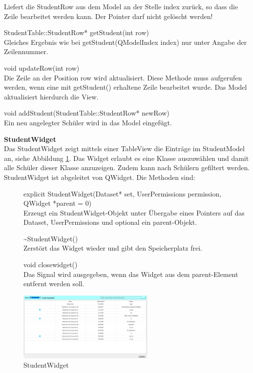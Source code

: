 \begin{description}
	Liefert die StudentRow aus dem Model an der Stelle index zurück, so dass die Zeile bearbeitet werden kann. Der Pointer darf nicht gelöscht werden!
  \item[ ] StudentTable::StudentRow* getStudent(int row)\\
	Gleiches Ergebnis wie bei getStudent(QModelIndex index) nur unter Angabe der Zeilennummer.
  \item[ ] void updateRow(int row)\\
	Die Zeile an der Position row wird aktualisiert. Diese Methode muss aufgerufen werden, wenn eine mit getStudent() erhaltene Zeile bearbeitet wurde. Das Model aktualisiert hierdurch die View.
  \item[ ] void addStudent(StudentTable::StudentRow* newRow)\\
	Ein neu angelegter Schüler wird in das Model eingefügt.
\end{description}
    
\textbf{StudentWidget}\\
Das StudentWidget zeigt mittels einer TableView die Einträge im StudentModel an, siehe Abbildung \ref{fig:StudentWidget}. Das Widget erlaubt es eine Klasse auszuwählen und damit alle Schüler dieser Klasse anzuzeigen. Zudem kann nach Schülern gefiltert werden. StudentWidget ist abgeleitet von QWidget. Die Methoden sind:
\begin{description}
	\item[ ] explicit StudentWidget(Dataset* set, UserPermissions permission, QWidget *parent = 0)\\
	Erzeugt ein StudentWidget-Objekt unter Übergabe eines Pointers auf das Dataset, UserPermissions und optional ein parent-Objekt.
  \item[ ] \~{}StudentWidget()\\
	Zerstört das Widget wieder und gibt den Speicherplatz frei.
	\item[ ] void closewidget()\\
	Das Signal wird ausgegeben, wenn das Widget aus dem parent-Element entfernt werden soll.	
\end{description}
\begin{figure}[htb]
	\centering
		\includegraphics[width=0.60\textwidth]{figures/StudentWidget.PNG}
	\caption{StudentWidget}
	\label{fig:StudentWidget}
\end{figure}

